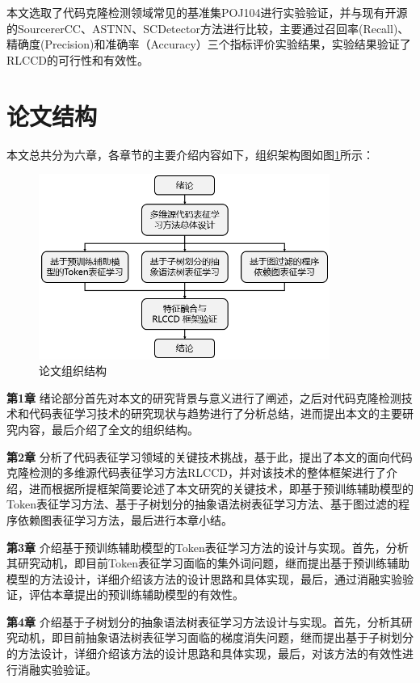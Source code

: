 本文选取了代码克隆检测领域常见的基准集POJ104进行实验验证，并与现有开源的SourcererCC\cite{7886988}、ASTNN\cite{8812062}、SCDetector\cite{10.1145/3324884.3416562}方法进行比较，主要通过召回率(Recall)、精确度(Precision)和准确率（Accuracy）三个指标评价实验结果，实验结果验证了RLCCD的可行性和有效性。

\section{论文结构}
\label{sec:Summary1}
本文总共分为六章，各章节的主要介绍内容如下，组织架构图如图\ref{fig:Structure}所示：

\begin{figure}[H]
    \centering
    \includegraphics[width=0.85\textwidth]{figures/Structure}
    \caption{论文组织结构}\label{fig:Structure}
\end{figure}

\textbf{第1章} \quad 绪论部分首先对本文的研究背景与意义进行了阐述，之后对代码克隆检测技术和代码表征学习技术的研究现状与趋势进行了分析总结，进而提出本文的主要研究内容，最后介绍了全文的组织结构。

\textbf{第2章}  \quad 分析了代码表征学习领域的关键技术挑战，基于此，提出了本文的面向代码克隆检测的多维源代码表征学习方法RLCCD，并对该技术的整体框架进行了介绍，进而根据所提框架简要论述了本文研究的关键技术，即基于预训练辅助模型的Token表征学习方法、基于子树划分的抽象语法树表征学习方法、基于图过滤的程序依赖图表征学习方法，最后进行本章小结。

\textbf{第3章}  \quad 介绍基于预训练辅助模型的Token表征学习方法的设计与实现。首先，分析其研究动机，即目前Token表征学习面临的集外词问题，继而提出基于预训练辅助模型的方法设计，详细介绍该方法的设计思路和具体实现，最后，通过消融实验验证，评估本章提出的预训练辅助模型的有效性。

\textbf{第4章}  \quad 介绍基于子树划分的抽象语法树表征学习方法设计与实现。首先，分析其研究动机，即目前抽象语法树表征学习面临的梯度消失问题，继而提出基于子树划分的方法设计，详细介绍该方法的设计思路和具体实现，最后，对该方法的有效性进行消融实验验证。


